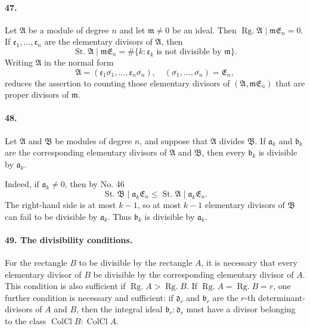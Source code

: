 \documentclass[11pt]{article}
\newcommand{\Rg}{\operatorname{Rg.}}
\newcommand{\Kkl}{\operatorname{ColCl}}
\newcommand{\St}{\operatorname{St.}}
\begin{document}
\paragraph{47.}
Let $\mathfrak A$ be a module of degree $n$ and let $\mathfrak m\ne0$ be an ideal. Then $\Rg\mathfrak A\mid\mathfrak m\mathfrak E_n=0$. If $\mathfrak e_1,
\ldots,
\mathfrak e_n$ are the elementary divisors of $\mathfrak A$, then
\[
\St\mathfrak A\mid\mathfrak m\mathfrak E_n
=
\#\{k:\mathfrak e_k\text{ is not divisible by }\mathfrak m\}.
\]
Writing $\mathfrak A$ in the normal form
\[
\mathfrak A=(\mathfrak e_1\overline{\sigma_1},
\ldots,
\mathfrak e_n\overline{\sigma_n}),
\quad
(\overline{\sigma_1},
\ldots,
\overline{\sigma_n})=\mathfrak E_n,
\]
reduces the assertion to counting those elementary divisors of $(\mathfrak A,
\mathfrak m\mathfrak E_n)$ that are proper divisors of $\mathfrak m$.

\paragraph{48.}
Let $\mathfrak A$ and $\mathfrak B$ be modules of degree $n$, and suppose that $\mathfrak A$ divides $\mathfrak B$. If $\mathfrak a_k$ and $\mathfrak b_k$ are the corresponding elementary divisors of $\mathfrak A$ and $\mathfrak B$, then every $\mathfrak b_k$ is divisible by $\mathfrak a_k$.

Indeed, if $\mathfrak a_k\ne0$, then by No. 46
\begin{equation}
\St\mathfrak B\mid\mathfrak a_k\mathfrak E_n
\le
\St\mathfrak A\mid\mathfrak a_k\mathfrak E_n.
\tag{81}
\end{equation}
The right-hand side is at most $k-1$, so at most $k-1$ elementary divisors of $\mathfrak B$ can fail to be divisible by $\mathfrak a_k$. Thus $\mathfrak b_k$ is divisible by $\mathfrak a_k$.

\paragraph{49. The divisibility conditions.}
For the rectangle $B$ to be divisible by the rectangle $A$, it is necessary that every elementary divisor of $B$ be divisible by the corresponding elementary divisor of $A$. This condition is also sufficient if $\Rg A>\Rg B$. If $\Rg A=\Rg B=r$, one further condition is necessary and sufficient: if $\mathfrak d_r$ and $\mathfrak b_r$ are the $r$-th determinant-divisors of $A$ and $B$, then the integral ideal $\mathfrak b_r:\mathfrak d_r$ must have a divisor belonging to the class $\Kkl B:\Kkl A$.
\end{document}
